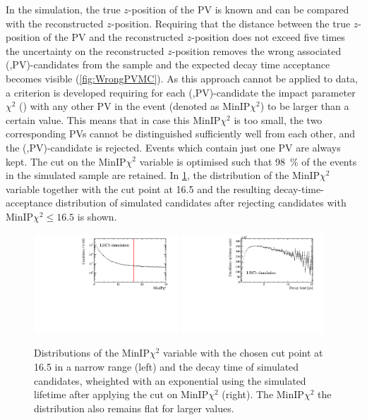 In the simulation, the true $z$-position of the \ac{PV} is known and can be compared with the reconstructed $z$-position.
Requiring that the distance between the true $z$-position of the \ac{PV} and the reconstructed $z$-position does not exceed five times the uncertainty on the reconstructed $z$-position removes the wrong associated (\Bz,\ac{PV})-candidates from the sample and the expected decay time acceptance becomes visible (\cref{fig:WrongPVMC}).
As this approach cannot be applied to data, a criterion is developed requiring for each (\Bz,\ac{PV})-candidate the impact parameter $\chi^2$ (\chisqip) with any other \ac{PV} in the event (denoted as $\text{MinIP}\chi^2$) to be larger than a certain value.
This means that in case this $\text{MinIP}\chi^2$ is too small, the two corresponding \ac{PV}s cannot be distinguished sufficiently well from each other, and the (\Bz,\ac{PV})-candidate is rejected.
Events which contain just one \ac{PV} are always kept.
The cut on the $\text{MinIP}\chi^2$ variable is optimised such that \SI{98}{\percent} of the events in the simulated \BdToDpi sample are retained.
In \cref{fig:WrongPVData}, the distribution of the $\text{MinIP}\chi^2$ variable together with the cut point at \num{16.5} and the resulting decay-time-acceptance distribution of simulated candidates after rejecting candidates with $\text{MinIP}\chi^2\le\num{16.5}$ is shown.
\begin{figure}[tbp]
    \centering
    \includegraphics[width=0.48\textwidth]{07selection/figs/MinIPCHI2.pdf}
    \includegraphics[width=0.48\textwidth]{07selection/figs/WrongPVs-WeightingGoodData.pdf}
    \caption{Distributions of the $\text{MinIP}\chi^2$ variable with the chosen cut point at \num{16.5} in a narrow range (left) and the decay time of simulated \BdToDpi candidates, wheighted with an exponential using the simulated \Bz lifetime after applying the cut on $\text{MinIP}\chi^2$ (right). The $\text{MinIP}\chi^2$ the distribution also remains flat for larger values.}
    \label{fig:WrongPVData}
\end{figure}


